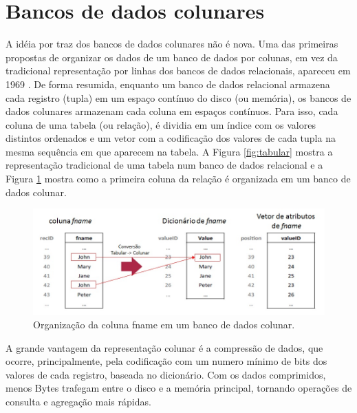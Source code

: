 \section{Bancos de dados colunares} \label{colunar}
A idéia por traz dos bancos de dados colunares não é nova. Uma das primeiras propostas de organizar os dados de um banco de dados por colunas, em vez da tradicional representação por linhas dos bancos de dados relacionais, apareceu em 1969 \cite{Estabrook1969327}. De forma resumida, enquanto um banco de dados relacional armazena cada registro (tupla) em um espaço contínuo do disco (ou memória), os bancos de dados colunares armazenam cada coluna em espaços contínuos. Para isso, cada coluna de uma tabela (ou relação), é dividia em um índice com os valores distintos ordenados e um vetor com a codificação dos valores de cada tupla na mesma sequência em que aparecem na tabela. A Figura \ref{fig:tabular} mostra a representação tradicional de uma tabela num banco de dados relacional e a Figura \ref{fig:colunar} mostra como a primeira coluna da relação é organizada em um banco de dados colunar.

\begin{figure}
	\centering
	\includegraphics[width=\linewidth]{./Representacao_colunar.jpg}
	\caption{Organização da coluna fname em um banco de dados colunar.}
	\label{fig:colunar}
\end{figure}

A grande vantagem da representação colunar é a compressão de dados, que ocorre, principalmente, pela codificação com um numero mínimo de bits dos valores de cada registro, baseada no dicionário. Com os dados comprimidos, menos Bytes trafegam entre o disco e a memória principal, tornando operações de consulta e agregação mais rápidas.

